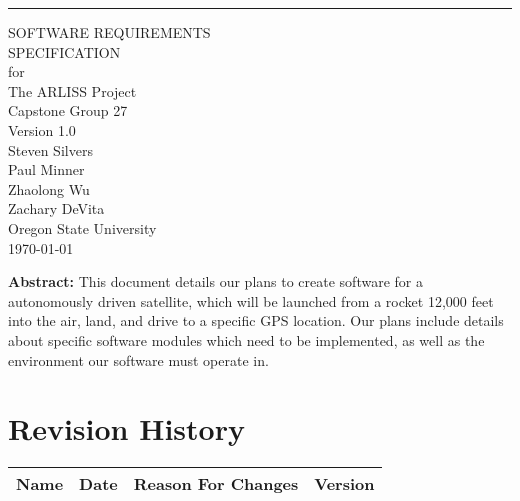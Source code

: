 \documentclass{scrreprt}
\date{}
\def\myversion{1.0 }
\begin{document}
\begin{flushright}
    \rule{16cm}{5pt}\vskip1cm
    \begin{bfseries}
        \Huge{SOFTWARE REQUIREMENTS\\ SPECIFICATION}\\
        \vspace{1.9cm}
        for\\
        \vspace{1.9cm}
        The ARLISS Project\\
        \vspace{1.5cm}
        \LARGE{Capstone Group 27}\\
        
        \LARGE{Version \myversion}\\
        \vspace{1.7cm}
        	Steven Silvers\\
	Paul Minner\\
        	Zhaolong Wu\\
	Zachary DeVita\\
        \vspace{1.5cm}
        Oregon State University\\
        
        \today\\
	\vspace{1.9cm}
    \end{bfseries}
\end{flushright}
    \textbf{Abstract:} This document details our plans to create software for a autonomously driven satellite, which will be launched from a rocket 12,000 feet into the air, land, and drive to a specific GPS location. Our plans include details about specific software modules which need to be implemented, as well as the environment our software must operate in.  
\tableofcontents
{}

\chapter*{Revision History}

\begin{center}
    \begin{tabular}{|c|c|c|c|}
        \hline
	    Name & Date & Reason For Changes & Version\\
        \hline
    \end{tabular}
\end{center}
\end{document}
